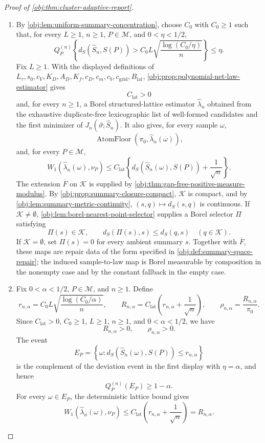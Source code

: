 \documentclass[11pt]{article}
\begin{document}
\begin{proof}[Proof of \cref{obj:thm:cluster-adaptive-report}]
\begin{enumerate}
\item By \cref{obj:lem:uniform-summary-concentration}, choose \(C_0\) with
\(C_0\ge1\) such that, for every \(L\ge1\), \(n\ge1\), \(P\in\mathcal M\),
and \(0<\eta<1/2\),
\[
Q_P^{(n)}
\left\{
d_S(\widehat S_n,S(P))
>
C_0L\sqrt{\frac{\log(C_0/\eta)}{n}}
\right\}
\le \eta .
\]
Fix \(L\ge1\).  With the displayed definitions of
\(L_\tau,s_0,c_V,K_D,A_D,K_f,c_D,c_m,c_b,c_{\mathrm{grid}},B_{\mathrm{lat}}\),
\cref{obj:prop:polynomial-net-law-estimator} gives
\[
C_{\mathrm{lat}}>0
\]
and, for every \(n\ge1\), a Borel structured-lattice estimator
\(\widehat\lambda_n\) obtained from the exhaustive duplicate-free lexicographic
list of well-formed candidates and the first minimizer of
\(J_n(\vartheta;\widehat S_n)\).  It also gives, for every sample \(\omega\),
\[
\operatorname{AtomFloor}(\pi_0,\widehat\lambda_n(\omega)),
\]
and, for every \(P\in\mathcal M\),
\[
W_1(\widehat\lambda_n(\omega),\nu_P)
\le
C_{\mathrm{lat}}
\left\{
d_S(\widehat S_n(\omega),S(P))+\frac1{\sqrt n}
\right\}.
\]
The extension \(\overline F\) on \(\mathcal K\) is supplied by
\cref{obj:thm:gap-free-positive-measure-modulus}.  By
\cref{obj:prop:summary-closure-compact}, \(\mathcal K\) is compact, and by
\cref{obj:lem:summary-metric-continuity}, \((s,q)\mapsto d_S(s,q)\) is
continuous.  If \(\mathcal K\ne\emptyset\), \cref{obj:lem:borel-nearest-point-selector}
supplies a Borel selector \(\Pi\) satisfying
\[
\Pi(s)\in\mathcal K,
\qquad
d_S(\Pi(s),s)\le d_S(q,s)\quad(q\in\mathcal K).
\]
If \(\mathcal K=\emptyset\), set \(\Pi(s)=0\) for every ambient summary \(s\).
Together with \(\overline F\), these maps are repair data of the form specified
in \cref{obj:def:summary-space-repair}; the induced sample-to-law map is Borel
measurable by composition in the nonempty case and by the constant fallback in
the empty case. %

\item Fix \(0<\alpha<1/2\), \(P\in\mathcal M\), and \(n\ge1\).  Define
\[
r_{n,\alpha}
=
C_0L\sqrt{\frac{\log(C_0/\alpha)}{n}},
\qquad
R_{n,\alpha}
=
C_{\mathrm{lat}}\left(r_{n,\alpha}+\frac1{\sqrt n}\right),
\qquad
\rho_{n,\alpha}=\frac{R_{n,\alpha}}{\pi_0}.
\]
Since \(C_{\mathrm{lat}}>0\), \(C_0\ge1\), \(L\ge1\), \(n\ge1\), and
\(0<\alpha<1/2\), we have
\[
R_{n,\alpha}>0,
\qquad
\rho_{n,\alpha}>0.
\]
The event
\[
E_P=\left\{\omega:d_S(\widehat S_n(\omega),S(P))\le r_{n,\alpha}\right\}
\]
is the complement of the deviation event in the first display with
\(\eta=\alpha\), and hence
\[
Q_P^{(n)}(E_P)\ge1-\alpha .
\]
For every \(\omega\in E_P\), the deterministic lattice bound gives
\[
W_1(\widehat\lambda_n(\omega),\nu_P)
\le
C_{\mathrm{lat}}
\left(r_{n,\alpha}+\frac1{\sqrt n}\right)
=
R_{n,\alpha}. %
\]


\end{enumerate}
\end{proof}
\end{document}
